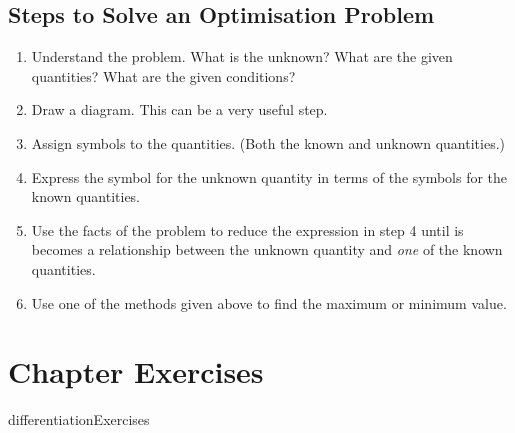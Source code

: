 \subsection*{Steps to Solve an Optimisation Problem}
\begin{enumerate}
\item Understand the problem. What is the unknown? What
are the given quantities? What are the given conditions? 

\item Draw
a diagram. This can be a very useful step. 

\item Assign
symbols to the quantities. (Both the known and unknown quantities.) 

\item Express the symbol for the
unknown quantity in terms of the symbols for the known quantities. 

\item Use the facts of the problem
to reduce the expression in step 4 until is becomes a relationship between the unknown quantity and \emph{one} of the known quantities.


\item Use one of the methods given above to find the maximum or minimum value.\vspace{1cm}
\end{enumerate}



\section{Chapter Exercises}
{differentiationExercises}
